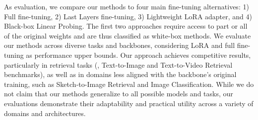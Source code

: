 
As evaluation, we compare our methods to four main fine-tuning alternatives: 1) Full fine-tuning, 2) Last Layers fine-tuning, 3) Lightweight LoRA \citep{lora} adapter, and 4) Black-box Linear Probing. The first two approaches require access to part or all of the original weights and are thus classified as white-box methods. We evaluate our methods across diverse tasks and backbones, considering LoRA and full fine-tuning as performance upper bounds. Our \oursFull approach achieves competitive results, particularly in retrieval tasks (\eg, Text-to-Image and Text-to-Video Retrieval benchmarks), as well as in domains less aligned with the backbone’s original training, such as Sketch-to-Image Retrieval and Image Classification. While we do not claim that our methods generalize to all possible models and tasks, our evaluations demonstrate their adaptability and practical utility across a variety of domains and architectures.



